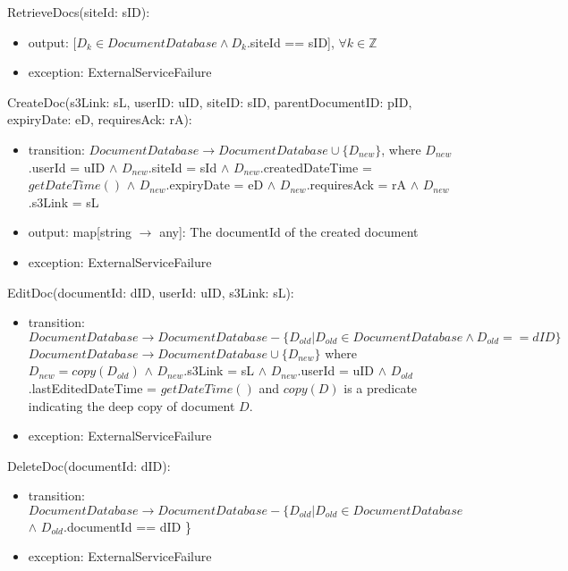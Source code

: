 \documentclass[12pt, titlepage]{article}
\begin{document}
  \noindent RetrieveDocs(siteId: sID):
  \begin{itemize}
    \item output: $[D_{k} \in DocumentDatabase \land D_{k}$.siteId ==
      sID], $\forall
      k \in \mathbb{Z}$
    \item exception: ExternalServiceFailure
  \end{itemize}

  \noindent CreateDoc(s3Link: sL, userID: uID, siteID: sID,
    parentDocumentID: pID,
  expiryDate: eD, requiresAck: rA):
  \begin{itemize}
    \item transition: $DocumentDatabase \rightarrow DocumentDatabase
      \cup \{D_{new}\}$, where $D_{new}$.userId = uID $\land$ $D_{new}$.siteId =
      sId $\land$ $D_{new}$.createdDateTime = $getDateTime()$ $\land$
      $D_{new}$.expiryDate = eD $\land$
      $D_{new}$.requiresAck = rA $\land$ $D_{new}$.s3Link = sL
    \item output: map[string $\rightarrow$ any]: The documentId of the created
      document
    \item exception: ExternalServiceFailure
  \end{itemize}

  \noindent EditDoc(documentId: dID, userId: uID, s3Link: sL):
  \begin{itemize}
    \item transition: $DocumentDatabase \rightarrow DocumentDatabase - \{D_{old}
      | D_{old} \in DocumentDatabase \land D_{old} == dID\}$\\
      $DocumentDatabase \rightarrow DocumentDatabase \cup
      \{D_{new}\}$ where $D_{new} = copy(D_{old})$ $\land$ $D_{new}$.s3Link = sL
      $\land$ $D_{new}$.userId = uID $\land$
      $D_{old}$.lastEditedDateTime = $getDateTime()$ and $copy(D)$ is
      a predicate indicating the
      deep copy of document $D$.
    \item exception: ExternalServiceFailure
  \end{itemize}

  \noindent DeleteDoc(documentId: dID):
  \begin{itemize}
    \item transition: $DocumentDatabase \rightarrow DocumentDatabase -
      \{D_{old} | D_{old} \in DocumentDatabase$ $\land$
      $D_{old}$.documentId == dID \}
    \item exception: ExternalServiceFailure
  \end{itemize}
\end{document}
